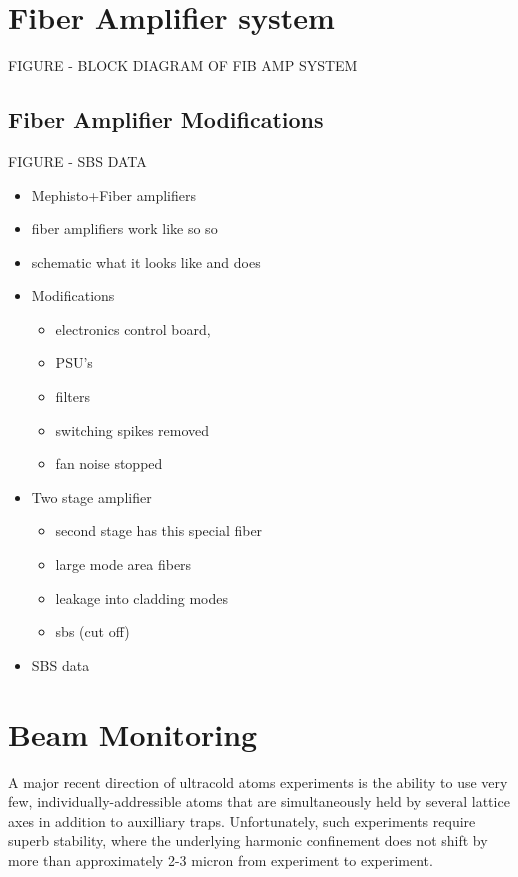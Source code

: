 \documentclass[twocolumn,aps,pra,showpacs,preprintnumbers,bibnotes]{revtex4-1}
\begin{document}
\section{Fiber Amplifier system}
FIGURE - BLOCK DIAGRAM OF FIB AMP SYSTEM

\subsection{Fiber Amplifier Modifications}
FIGURE - SBS DATA
\begin{itemize}
	\item Mephisto+Fiber amplifiers
\item fiber amplifiers work like so so
\item schematic what it looks like and does
\item Modifications
	\begin{itemize}
		\item electronics control board,
		\item PSU's
		\item filters
		\item switching spikes removed
		\item fan noise stopped
	\end{itemize}
\item Two stage amplifier
	\begin{itemize}
		\item second stage has this special fiber 
		\item large mode area fibers
		\item leakage into cladding modes 
		\item sbs (cut off)
	\end{itemize}
\item SBS data
\end{itemize}
\section{Beam Monitoring}
A major recent direction of ultracold atoms experiments is the ability to use very few, individually-addressible atoms\cite{Mazurenko2016, Farhi} that are simultaneously held by several lattice axes in addition to auxilliary traps.
Unfortunately, such experiments require superb stability, where the underlying harmonic confinement does not shift by more than approximately 2-3 micron from experiment to experiment. 
\end{document}
